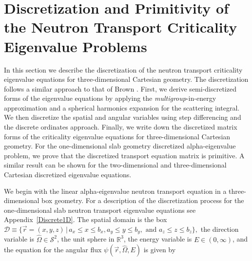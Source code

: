 \chapter[Discretization and Primitivity of the Neutron Transport Criticality\\ Eigenvalue Problems][Discretization and Primitivity]{Discretization and Primitivity of the Neutron Transport Criticality Eigenvalue Problems}
\label{Discrete}

In this section we describe the discretization of the neutron transport criticality eigenvalue equations for three-dimensional Cartesian geometry. The discretization follows a similar approach to that of Brown \cite{brown_linear_1995} \cite{brown_POI_2008} \cite{brown_POI_2012}. First, we derive semi-discretized forms of the eigenvalue equations by applying the \textit{multigroup}-in-energy approximation and a spherical harmonics expansion for the scattering integral. We then discretize the spatial and angular variables using step differencing and the discrete ordinates approach. Finally, we write down the discretized matrix forms of the criticality eigenvalue equations for three-dimensional Cartesian geometry. For the one-dimensional slab geometry discretized alpha-eigenvalue problem, we prove that the discretized transport equation matrix is primitive. A similar result can be shown for the two-dimensional and three-dimensional Cartesian discretized eigenvalue equations.

We begin with the linear alpha-eigenvalue neutron transport equation in a three-dimen\-sional box geometry. For a description of the discretization process for the one-dimensional slab neutron transport eigenvalue equations see Appendix~\ref{Discrete1D}. The spatial domain is the box $\mathcal{D} \equiv \{\vec{r} = (x, y, z) \, \vert \, a_{x} \leq x \leq b_{x}, a_{y} \leq y \leq b_{y}, \text{ and } a_{z} \leq z \leq b_{z} \},$ the direction variable is $\hat{\Omega} \in \mathcal{S}^{2}$, the unit sphere in $\mathbb{R}^{3}$, the energy variable is $E \in (0, \infty)$, and the equation for the angular flux $\psi(\vec{r}, \hat{\Omega}, E)$ is given by

